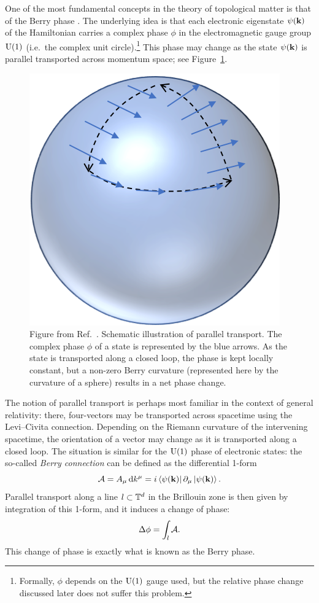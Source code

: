 One of the most fundamental concepts in the theory of topological matter is that of the Berry phase \cite{Berry_phase}. The underlying idea is that each electronic eigenstate $\psi(\vb{k})$ of the Hamiltonian carries a complex phase $\phi$ in the electromagnetic gauge group $\operatorname{U}(1)$ (i.e.\ the complex unit circle).\footnote{
Formally, $\phi$ depends on the $\operatorname{U}(1)$ gauge used, but the relative phase change discussed later does not suffer this problem.}
This phase may change as the state $\psi(\vb{k})$ is parallel transported across momentum space; see Figure~\ref{fig:parallel_transport}.
\begin{figure}[htb!]
	\centering
	\includegraphics[width=.4\linewidth]{Images/parallel_transport}
	\caption{Figure from Ref.~\cite{Natelson_Berry}. Schematic illustration of parallel transport. The complex phase $\phi$ of a state is represented by the blue arrows. As the state is transported along a closed loop, the phase is kept locally constant, but a non-zero Berry curvature (represented here by the curvature of a sphere) results in a net phase change.}
	\label{fig:parallel_transport}
\end{figure}

The notion of parallel transport is perhaps most familiar in the context of general relativity: there, four-vectors may be transported across spacetime using the Levi--Civita connection. Depending on the Riemann curvature of the intervening spacetime, the orientation of a vector may change as it is transported along a closed loop. The situation is similar for the $\operatorname{U}(1)$ phase of electronic states: the so-called \emph{Berry connection} can be defined as the differential 1-form
\begin{equation*}
	\mathcal{A} = A_\mu \dd{k^\mu} = i\bra{\psi(\vb{k})}\partial_\mu\ket{\psi(\vb{k})}.
\end{equation*}
Parallel transport along a line $l\subset\mathbb{T}^d$ in the Brillouin zone is then given by integration of this 1-form, and it induces a change of phase:
\begin{equation*}
	\Delta\phi = \int_l \mathcal{A}.
\end{equation*}
This change of phase is exactly what is known as the Berry phase.

